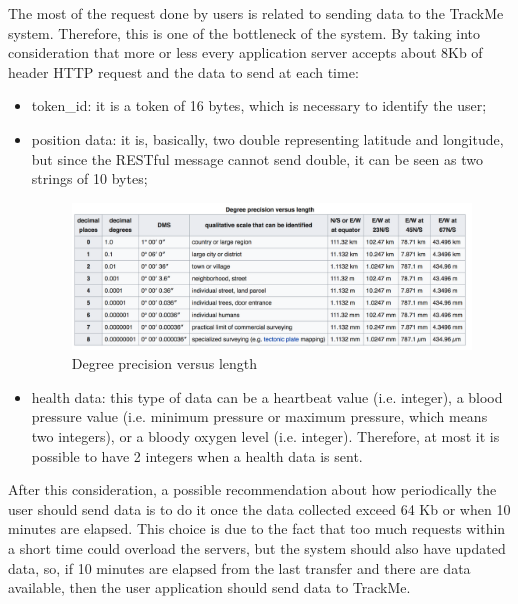 The most of the request done by users is related to sending data to the TrackMe system. Therefore, this is one of the bottleneck 
of the system. By taking into consideration that more or less every application server accepts about 8Kb of header HTTP request and the data to send at each time:
\begin{itemize}
\item token\_id: it is a token of 16 bytes, which is necessary to identify the user;
\item position data: it is, basically, two double representing latitude and longitude, but since the RESTful message cannot send double, it can be seen as two strings of 10 bytes;
\begin{figure}[H]
\includegraphics[width=\linewidth]{Images/gpsprecision.pdf}
\caption{ Degree precision versus length }
\label{fig:precisiongps}
\end{figure}
\item health data: this type of data can be a heartbeat value (i.e. integer), a blood pressure value (i.e. minimum pressure or maximum pressure, which means two integers), or a bloody oxygen level (i.e. integer). Therefore, at most it is possible to have 2 integers when a health data is sent.
\end{itemize}
After this consideration, a possible recommendation about how periodically the user should send data is to do it once the data collected exceed 64 Kb or when 10 minutes are elapsed. This choice is due to the fact that too much requests within a short time could overload the servers, but the system should also have updated data, so, if 10 minutes are elapsed from the last transfer and there are data available, then  the user application should send data to TrackMe.
